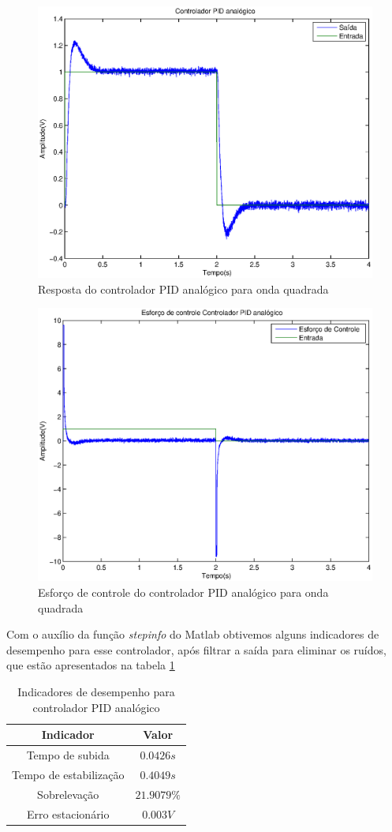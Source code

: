 \documentclass{article}
\begin{document}
\begin{figure}[H]
	\centering
	\includegraphics[width=0.8\linewidth]{ysemfiltro}
	\caption{Resposta do controlador PID analógico para onda quadrada}
	\label{fig:ysemfiltro}
\end{figure}
\begin{figure}[H]
	\centering
	\includegraphics[width=0.8\linewidth]{upid}
	\caption{Esforço de controle do controlador PID analógico para onda quadrada}
	\label{fig:upid}
\end{figure}

Com o auxílio da função \textit{stepinfo} do Matlab obtivemos alguns indicadores de desempenho para esse controlador, após filtrar a saída para eliminar os ruídos, que estão apresentados na tabela \ref{tab:pida}
\begin{table}[H]
	\centering
	\caption{Indicadores de desempenho para controlador PID analógico}
	\label{tab:pida}
	\begin{tabular}{|c|c|}
		\hline Indicador & Valor \\ 
		\hline Tempo de subida & $0.0426s$\\ 
		\hline Tempo de estabilização & $0.4049s$\\ 
		\hline Sobrelevação & $21.9079\%$\\ 
		\hline Erro estacionário& $0.003 V$\\ 
		\hline 
	\end{tabular} 
\end{table}
\end{document}
